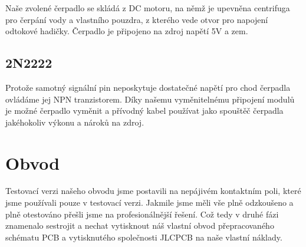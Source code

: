 \documentclass[11pt,a4paper]{article}
\begin{document}
Naše zvolené čerpadlo se skládá z DC motoru, na němž je upevněna centrifuga pro
čerpání vody a vlastního pouzdra, z kterého vede otvor pro napojení odtokové
hadičky. Čerpadlo je připojeno na zdroj napětí 5V a zem.

\subsection{2N2222}

Protože samotný signální pin neposkytuje dostatečné napětí pro chod čerpadla
ovládáme jej NPN tranzistorem. Díky našemu vyměnitelnému připojení modulů je
možné čerpadlo vyměnit a přívodný kabel používat jako spouštěč čerpadla
jakéhokoliv výkonu a nároků na zdroj.

\clearpage

\section{Obvod}

Testovací verzi našeho obvodu jsme postavili na nepájivém kontaktním poli,
které jsme používali pouze v testovací verzi. Jakmile jsme měli vše plně
odzkoušeno a plně otestováno přešli jsme na profesionálnější řešení.
Což tedy v druhé fázi znamenalo sestrojit a nechat vytisknout náš vlastní obvod
přepracovaného schématu PCB a vytisknutého společnosti JLCPCB na naše vlastní
náklady.
\end{document}
